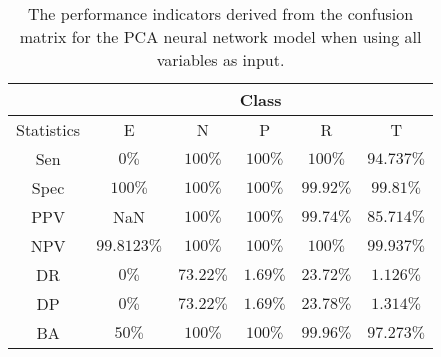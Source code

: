 \begin{table}[!ht]
	\centering
	\begin{tabular}{|c|c|c|c|c|c|}
		\hline
		 & \multicolumn{5}{c|}{Class} \\ \hline
		Statistics & E & N & P & R & T \\ \hline
		Sen & $0\%$ & $100\%$ & $100\%$ & $100\%$ & $94.737\%$ \\ \hline
		Spec & $100\%$ & $100\%$ & $100\%$ & $99.92\%$ & $99.81\%$ \\ \hline
		PPV & NaN & $100\%$ & $100\%$ & $99.74\%$ & $85.714\%$ \\ \hline
		NPV & $99.8123\%$ & $100\%$ & $100\%$ & $100\%$ & $99.937\%$ \\ \hline
		DR & $0\%$ & $73.22\%$ & $1.69\%$ & $23.72\%$ & $1.126\%$ \\ \hline
		DP & $0\%$ & $73.22\%$ & $1.69\%$ & $23.78\%$ & $1.314\%$ \\ \hline
		BA & $50\%$ & $100\%$ & $100\%$ & $99.96\%$ & $97.273\%$ \\ \hline
	\end{tabular}
	\caption{The performance indicators derived from the confusion matrix for the PCA neural network model when using all variables as input.}
	\label{tab:cs:reverse:all:pcaNNet}
\end{table}
